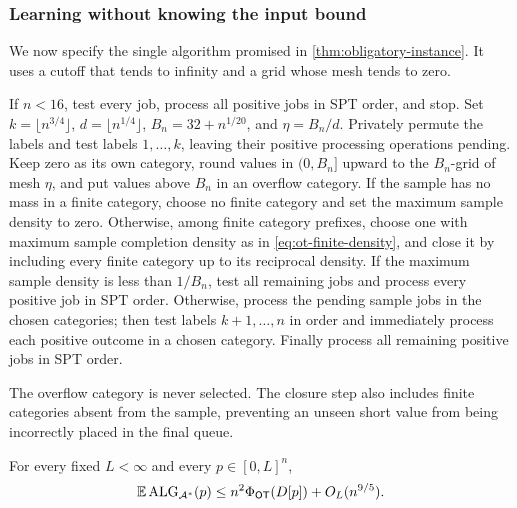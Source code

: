 \subsubsection{Learning without knowing the input bound}

We now specify the single algorithm promised in
\cref{thm:obligatory-instance}.  It uses a cutoff that tends to infinity and
a grid whose mesh tends to zero.

\begin{algorithm}[H]
\caption{}
\label{alg:ot-growing-cutoff-instance}
\begin{algorithmic}
\State If $n<16$, test every job, process all positive jobs in SPT order, and stop.
\State Set $k=\lfloor n^{3/4}\rfloor$, $d=\lfloor n^{1/4}\rfloor$,
       $B_n=32+n^{1/20}$, and $\eta=B_n/d$.
\State Privately permute the labels and test labels $1,\ldots,k$, leaving
       their positive processing operations pending.
\State Keep zero as its own category, round values in $(0,B_n]$ upward to
       the $B_n$-grid of mesh $\eta$, and put values above $B_n$ in an
       overflow category.
\State If the sample has no mass in a finite category, choose no finite
       category and set the maximum sample density to zero.
\State Otherwise, among finite category prefixes, choose one with maximum
       sample completion density as in \cref{eq:ot-finite-density}, and close
       it by including every finite category up to its reciprocal density.
\State If the maximum sample density is less than $1/B_n$, test all
       remaining jobs and process every positive job in SPT order.
\State Otherwise, process the pending sample jobs in the chosen categories;
       then test labels $k+1,\ldots,n$ in order and immediately process each
       positive outcome in a chosen category.
\State Finally process all remaining positive jobs in SPT order.
\end{algorithmic}
\end{algorithm}

The overflow category is never selected.  The closure step also includes
finite categories absent from the sample, preventing an unseen short value
from being incorrectly placed in the final queue.

\begin{claim}
\label{clm:ot-learning-upper}
For every fixed $L<\infty$ and every $p\in[0,L]^n$,
\begin{equation}
 \mathbb{E}\operatorname{ALG}_{\mathcal A^*}(p)
 \le n^2\Phi_{\mathsf{OT}}(D[p])+O_L(n^{9/5}).
 \label{eq:ot-instance-upper-rate}
\end{equation}
\end{claim}

